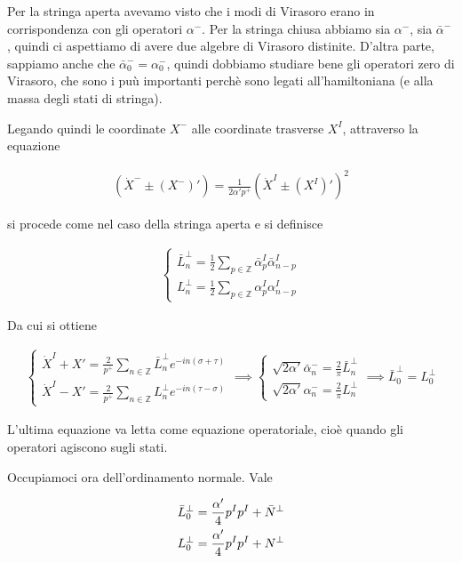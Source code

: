 \documentclass{report}
\begin{document}
Per la stringa aperta avevamo visto che i modi di Virasoro erano in corrispondenza con gli operatori \(\alpha^-\). Per la stringa chiusa abbiamo sia \(\alpha^-\), sia \(\bar{\alpha}^-\), quindi ci aspettiamo di avere due algebre di Virasoro distinite. D'altra parte, sappiamo anche che \(\bar{\alpha}^-_0 = \alpha_0^-\), quindi dobbiamo studiare bene gli operatori zero di Virasoro, che sono i puù importanti perchè sono legati all'hamiltoniana (e alla massa degli stati di stringa). 

Legando quindi le coordinate \(X^-\) alle coordinate trasverse \(X^I\), attraverso la equazione 

\begin{align}
    (\dot{X}^- \pm (X^-)') = \frac{1}{2\alpha' p^+}(\dot{X}^I \pm (X^I)')^2 
\end{align}

si procede come nel caso della stringa aperta e si definisce 

\begin{align}
    \begin{cases}
        \bar{L}_n^\perp = \frac{1}{2}\sum_{p\in \mathbb{Z}} \bar{\alpha}_p^I \bar{\alpha}_{n-p}^I \\
        L_n^\perp = \frac{1}{2}\sum_{p\in \mathbb{Z}} \alpha_p^I \alpha_{n-p}^I 
    \end{cases}
\end{align}

Da cui si ottiene 

\begin{align}
    \begin{cases}
        \dot{X}^I + X' = \frac{2}{p^+}\sum_{n\in \mathbb{Z}}\bar{L}_n^\perp e^{-in(\sigma+\tau)} \\ 
        \dot{X}^I - X' = \frac{2}{p^+}\sum_{n\in \mathbb{Z}}L_n^\perp e^{-in(\tau-\sigma)}
    \end{cases} \implies \begin{cases}
        \sqrt{2\alpha'}\bar{\alpha}_n^- = \frac{2}{\pi}\bar{L}_n^\perp \\
        \sqrt{2\alpha'}\alpha_n^- = \frac{2}{\pi}L_n^\perp  
    \end{cases} \implies \bar{L}_0^\perp = L_0^\perp
\end{align}

L'ultima equazione va letta come equazione operatoriale, cioè quando gli operatori agiscono sugli stati. 

Occupiamoci ora dell'ordinamento normale. Vale 

\begin{align}
    &\bar{L}_0^\perp = \frac{\alpha'}{4}p^I p^I + \bar{N}^\perp \notag \\ 
    &L_0^\perp = \frac{\alpha'}{4}p^Ip^I + N^\perp 
\end{align}
\end{document}
